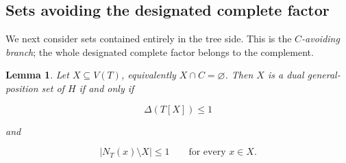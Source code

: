 \documentclass[11pt,a4paper]{article}
\newtheorem{lemma}[theorem]{Lemma}
\numberwithin{equation}{section}
\begin{document}
\subsection{Sets avoiding the designated complete factor}\label{sec:apex-avoiding}

We next consider sets contained entirely in the tree side. This is the
\emph{\(C\)-avoiding branch}; the whole designated complete factor belongs
to the complement.

\begin{lemma}\label{lem:apex-avoiding}
Let \(X\subseteq V(T)\), equivalently
\(X\cap C=\varnothing\). Then \(X\) is a dual general-position set of
\(H\) if and only if

\[
\Delta(T[X])\le 1
\]

and

\[
|N_T(x)\setminus X|\le 1\qquad\text{for every }x\in X.
\]
\end{lemma}
\end{document}
